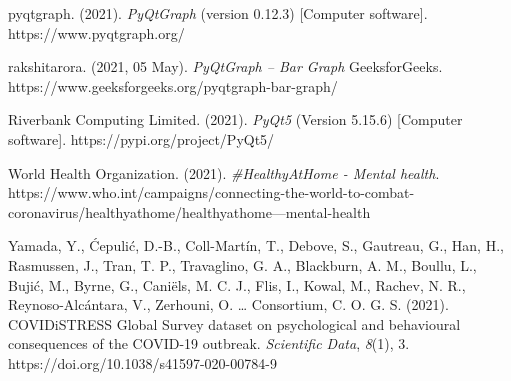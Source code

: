 \documentclass[fontsize=11pt]{article}
\begin{document}
    \hangindent=0.7cm \noindent
    pyqtgraph. (2021). \textit{PyQtGraph} (version 0.12.3) [Computer software].
    https://www.pyqtgraph.org/

    \hangindent=0.7cm \noindent
    rakshitarora. (2021, 05 May). \textit{PyQtGraph – Bar Graph} GeeksforGeeks.
    https://www.geeksforgeeks.org/pyqtgraph-bar-graph/

    \hangindent=0.7cm \noindent
    Riverbank Computing Limited. (2021). \textit{PyQt5} (Version 5.15.6) [Computer software].
    https://pypi.org/project/PyQt5/

    \hangindent=0.7cm \noindent
    World Health Organization. (2021). \textit{\#HealthyAtHome - Mental health}.
    https://www.who.int/campaigns/connecting-the-world-to-combat-coronavirus/healthyathome/healthyathome---mental-health

    \hangindent=0.7cm \noindent
    Yamada, Y., Ćepulić, D.-B., Coll-Martín, T., Debove, S., Gautreau, G., Han, H., Rasmussen, J., Tran, T. P., Travaglino, G. A., Blackburn, A. M., Boullu, L., Bujić, M., Byrne, G., Caniëls, M. C. J., Flis, I., Kowal, M., Rachev, N. R., Reynoso-Alcántara, V., Zerhouni, O. … Consortium, C. O. G. S. (2021). COVIDiSTRESS Global Survey dataset on psychological and behavioural consequences of the COVID-19 outbreak. \textit{Scientific Data}, \textit{8}(1), 3.
    https://doi.org/10.1038/s41597-020-00784-9
\end{document}
